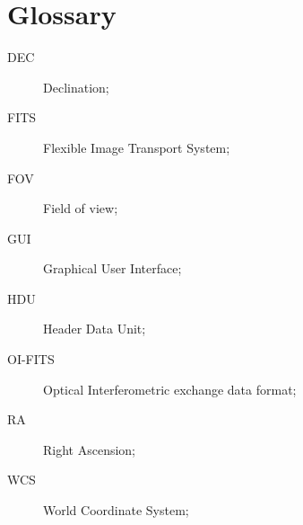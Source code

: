\documentclass{article}
\begin{document}
\section{Glossary}

\begin{description}
\item[DEC] Declination;
\item[FITS] Flexible Image Transport System;
\item[FOV] Field of view;
\item[GUI] Graphical User Interface;
\item[HDU] Header Data Unit;
\item[OI-FITS] Optical Interferometric exchange data format;
\item[RA] Right Ascension;
\item[WCS] World Coordinate System;
\end{description}



\end{document}
